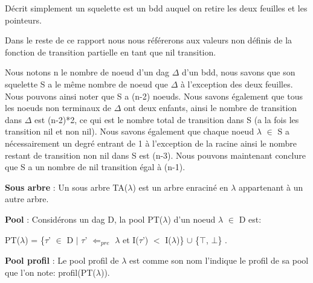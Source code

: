 \documentclass[french]{article}
\begin{document}
Décrit simplement un squelette est un bdd auquel on retire les deux feuilles et les pointeurs.

Dans le reste de ce rapport nous nous référerons aux valeurs non définis de la fonction de transition partielle en tant que nil transition.
\vspace{5mm} 

Nous notons n le nombre de noeud d'un dag \(\Delta\) d'un bdd, nous savons que son squelette S a le même nombre de noeud que \(\Delta\) à l'exception des deux feuilles. Nous pouvons ainsi noter que S a (n-2) noeuds. Nous savons également que tous les noeuds non terminaux de \(\Delta\) ont deux enfants, ainsi le nombre de transition dans \(\Delta\) est (n-2)*2, ce qui est le nombre total de transition dans S (a la fois les transition nil et non nil). Nous savons également que chaque noeud \(\lambda\) \(\in\) S a nécessairement un degré entrant de 1 à l'exception de la racine ainsi le nombre restant de transition non nil dans S est (n-3). Nous pouvons maintenant conclure que S a un nombre de nil transition égal à (n-1).
\vspace{5mm} 

\textbf{Sous arbre} : Un sous arbre TA(\(\lambda\)) est un arbre enraciné en \(\lambda\) appartenant à un autre arbre.

\textbf{Pool} : Considérons un dag D, la pool PT(\(\lambda\)) d'un noeud \(\lambda\) \(\in\) D est:

\begin{center}
PT(\(\lambda\)) = \{\(\tau\)’ \(\in\) D \(\mid\)  \(\tau\)’ \(\Leftarrow_{pre}\) \(\lambda\) et I(\(\tau\)’) \(<\) I(\(\lambda\))\} \(\cup\) \{\(\top\), \(\bot\)\} .
\end{center}

\textbf{Pool profil} : Le pool profil de \(\lambda\) est comme son nom l'indique le profil de sa pool que l'on note: profil(PT(\(\lambda\))). 
\end{document}
